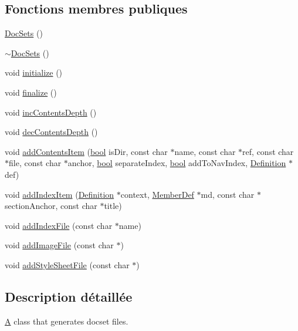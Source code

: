 \subsection*{Fonctions membres publiques}
\begin{DoxyCompactItemize}
\item 
\hyperlink{class_doc_sets_ad050cee55a579c4d01655f2041b5678b}{Doc\+Sets} ()
\item 
\hyperlink{class_doc_sets_aa825df57a02ee969cb4ff64890aeb94f}{$\sim$\+Doc\+Sets} ()
\item 
void \hyperlink{class_doc_sets_a7cad610aa745779c12a50c3dcf2cdf61}{initialize} ()
\item 
void \hyperlink{class_doc_sets_a8c00f9b45e88f7907db6a0e7488a7a0b}{finalize} ()
\item 
void \hyperlink{class_doc_sets_a5840cce402cd857d80a49275c70d0000}{inc\+Contents\+Depth} ()
\item 
void \hyperlink{class_doc_sets_a27dd321d6203de4d44b1b3b2fbc0a3a5}{dec\+Contents\+Depth} ()
\item 
void \hyperlink{class_doc_sets_a5d641c4cf123b6a4e5ba33e9d6f36144}{add\+Contents\+Item} (\hyperlink{qglobal_8h_a1062901a7428fdd9c7f180f5e01ea056}{bool} is\+Dir, const char $\ast$name, const char $\ast$ref, const char $\ast$file, const char $\ast$anchor, \hyperlink{qglobal_8h_a1062901a7428fdd9c7f180f5e01ea056}{bool} separate\+Index, \hyperlink{qglobal_8h_a1062901a7428fdd9c7f180f5e01ea056}{bool} add\+To\+Nav\+Index, \hyperlink{class_definition}{Definition} $\ast$def)
\item 
void \hyperlink{class_doc_sets_a5d979532e4ed0249c960401d1a163f8a}{add\+Index\+Item} (\hyperlink{class_definition}{Definition} $\ast$context, \hyperlink{class_member_def}{Member\+Def} $\ast$md, const char $\ast$section\+Anchor, const char $\ast$title)
\item 
void \hyperlink{class_doc_sets_ae9fc1949f8b1101a7f854292f7d0a4a2}{add\+Index\+File} (const char $\ast$name)
\item 
void \hyperlink{class_doc_sets_ae7cab9023e6c8e4d2d16144d3c5907c6}{add\+Image\+File} (const char $\ast$)
\item 
void \hyperlink{class_doc_sets_a6c482a3663c7ed24debd7507f8977c7a}{add\+Style\+Sheet\+File} (const char $\ast$)
\end{DoxyCompactItemize}


\subsection{Description détaillée}
\hyperlink{class_a}{A} class that generates docset files.

